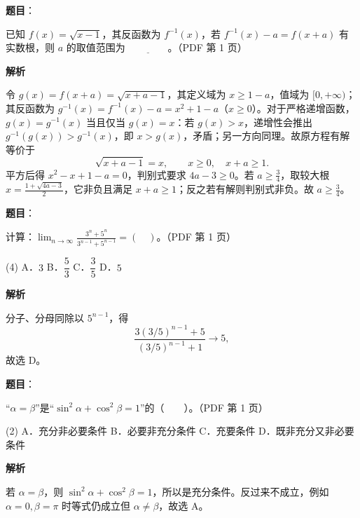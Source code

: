 \begin{answer}

\textbf{题目}：

已知 $f(x)=\sqrt{x-1}$，其反函数为 $f^{-1}(x)$，若 $f^{-1}(x)-a=f(x+a)$ 有实数根，则 $a$ 的取值范围为 $\underline{\qquad\qquad}$。（PDF 第 1 页）

\textbf{解析}

令 $g(x)=f(x+a)=\sqrt{x+a-1}$，其定义域为 $x\ge1-a$，值域为 $[0,+\infty)$；其反函数为 $g^{-1}(x)=f^{-1}(x)-a=x^2+1-a$（$x\ge0$）。对于严格递增函数，$g(x)=g^{-1}(x)$ 当且仅当 $g(x)=x$：若 $g(x)>x$，递增性会推出 $g^{-1}(g(x))>g^{-1}(x)$，即 $x>g(x)$，矛盾；另一方向同理。故原方程有解等价于
\nopagebreak[4]
\[
\sqrt{x+a-1}=x,\qquad x\ge0,\quad x+a\ge1.
\]
平方后得 $x^2-x+1-a=0$，判别式要求 $4a-3\ge0$。若 $a\ge\frac34$，取较大根 $x=\frac{1+\sqrt{4a-3}}2$，它非负且满足 $x+a\ge1$；反之若有解则判别式非负。故 $a\ge\frac34$。

\gkanswer{答案：$a\in[\frac34,+\infty)$}

\end{answer}
\begin{answer}

\textbf{题目}：

计算：$\displaystyle\lim_{n\to\infty}\frac{3^n+5^n}{3^{n-1}+5^{n-1}}=\left(\quad\right)$。（PDF 第 1 页）

\begin{gkopts}(4)
\task A．$3$
\task B．$\dfrac53$
\task C．$\dfrac35$
\task D．$5$
\end{gkopts}

\textbf{解析}

分子、分母同除以 $5^{n-1}$，得
\nopagebreak[4]
\[
\frac{3(3/5)^{n-1}+5}{(3/5)^{n-1}+1}\longrightarrow5,
\]
故选 D。


\end{answer}
\begin{answer}

\textbf{题目}：

“$\alpha=\beta$”是“$\sin^2\alpha+\cos^2\beta=1$”的\mbox{（　　）}。（PDF 第 1 页）

\begin{gkopts}(2)
\task A．充分非必要条件
\task B．必要非充分条件
\task C．充要条件
\task D．既非充分又非必要条件
\end{gkopts}

\textbf{解析}

若 $\alpha=\beta$，则 $\sin^2\alpha+\cos^2\beta=1$，所以是充分条件。反过来不成立，例如 $\alpha=0,\beta=\pi$ 时等式仍成立但 $\alpha\ne\beta$，故选 A。


\end{answer}

